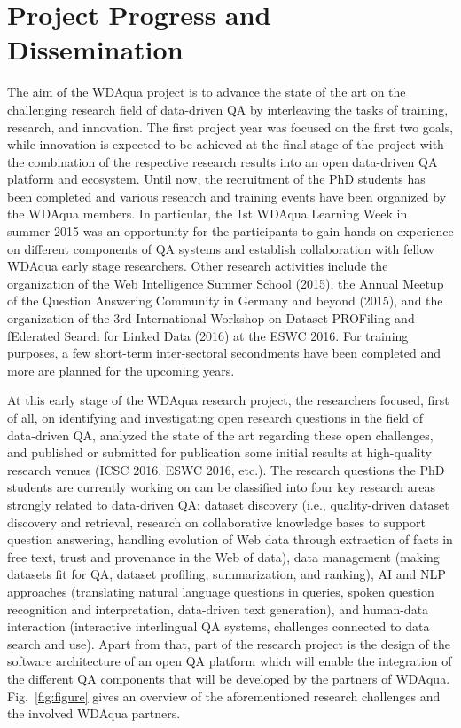 \documentclass[a4paper]{llncs}
\begin{document}
	\section{Project Progress and Dissemination} \label{sec:progress}
	The aim of the WDAqua project is to advance the state of the art on the challenging research field of data-driven QA by interleaving the tasks of training, research, and innovation.
        The first project year was focused on the first two goals, while innovation is expected to be achieved at the final stage of the project with the combination of the respective research results into an open data-driven QA platform and ecosystem.
	Until now, the recruitment of the PhD students has been completed and various research and training events have been organized by the WDAqua members.
        In particular, the 1st WDAqua Learning Week in summer 2015 was an opportunity for the participants to gain hands-on experience on different components of QA systems and establish collaboration with fellow WDAqua early stage researchers.
        Other research activities include the organization of the Web Intelligence Summer School (2015), the Annual Meetup of the Question Answering Community in Germany and beyond (2015), and the organization of the 3rd International Workshop on Dataset PROFiling and fEderated Search for Linked Data (2016) at the ESWC 2016.
	For training purposes, a few short-term inter-sectoral secondments have been completed and more are planned for the upcoming years.
	
	At this early stage of the WDAqua research project, the researchers focused, first of all, on identifying and investigating open research questions in the field of data-driven QA, analyzed the state of the art regarding these open challenges, and published or submitted for publication some initial results at high-quality research venues (ICSC 2016, ESWC 2016, etc.).
	The research questions the PhD students are currently working on can be classified into four key research areas strongly related to data-driven QA: dataset discovery (i.e., quality-driven dataset discovery and retrieval, research on collaborative knowledge bases to support question answering, handling evolution of Web data through extraction of facts in free text, trust and provenance in the Web of data), data management (making datasets fit for QA, dataset profiling, summarization, and ranking), AI and NLP approaches (translating natural language questions in queries, spoken question recognition and interpretation, data-driven text generation), and human-data interaction (interactive interlingual QA systems, challenges connected to data search and use).
        Apart from that, part of the research project is the design of the software architecture of an open QA platform which will enable the integration of the different QA components that will be developed by the partners of WDAqua.
        Fig.~\ref{fig:figure} gives an overview of the aforementioned research challenges and the involved WDAqua partners.
	
\end{document}

